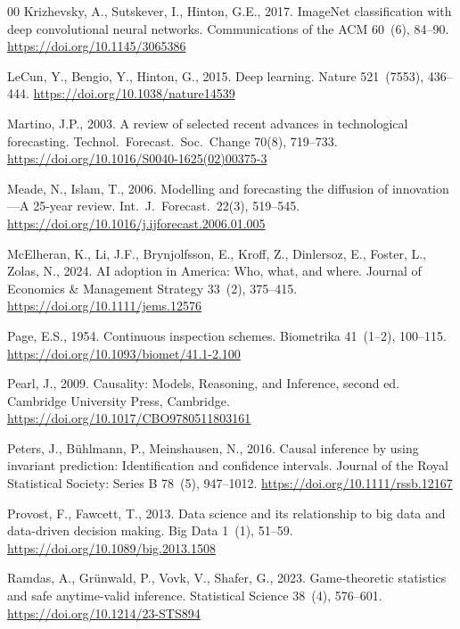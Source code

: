 \documentclass[review,authoryear,12pt]{elsarticle}
\begin{document}
\begin{thebibliography}{00}
Krizhevsky, A., Sutskever, I., Hinton, G.E., 2017. ImageNet classification with deep convolutional neural networks. Communications of the ACM 60~(6), 84--90. \url{https://doi.org/10.1145/3065386}

LeCun, Y., Bengio, Y., Hinton, G., 2015. Deep learning. Nature 521~(7553), 436--444. \url{https://doi.org/10.1038/nature14539}

Martino, J.P., 2003. A review of selected recent advances in technological forecasting. Technol.\ Forecast.\ Soc.\ Change 70(8), 719--733. \url{https://doi.org/10.1016/S0040-1625(02)00375-3}

Meade, N., Islam, T., 2006. Modelling and forecasting the diffusion of innovation---A 25-year review. Int.\ J.\ Forecast.\ 22(3), 519--545. \url{https://doi.org/10.1016/j.ijforecast.2006.01.005}

McElheran, K., Li, J.F., Brynjolfsson, E., Kroff, Z., Dinlersoz, E., Foster, L., Zolas, N., 2024. AI adoption in America: Who, what, and where. Journal of Economics \& Management Strategy 33~(2), 375--415. \url{https://doi.org/10.1111/jems.12576}

Page, E.S., 1954. Continuous inspection schemes. Biometrika 41~(1--2), 100--115. \url{https://doi.org/10.1093/biomet/41.1-2.100}

Pearl, J., 2009. Causality: Models, Reasoning, and Inference, second ed. Cambridge University Press, Cambridge. \url{https://doi.org/10.1017/CBO9780511803161}

Peters, J., B\"uhlmann, P., Meinshausen, N., 2016. Causal inference by using invariant prediction: Identification and confidence intervals. Journal of the Royal Statistical Society: Series B 78~(5), 947--1012. \url{https://doi.org/10.1111/rssb.12167}

Provost, F., Fawcett, T., 2013. Data science and its relationship to big data and data-driven decision making. Big Data 1~(1), 51--59. \url{https://doi.org/10.1089/big.2013.1508}

Ramdas, A., Gr\"unwald, P., Vovk, V., Shafer, G., 2023. Game-theoretic statistics and safe anytime-valid inference. Statistical Science 38~(4), 576--601. \url{https://doi.org/10.1214/23-STS894}


\end{thebibliography}
\end{document}
